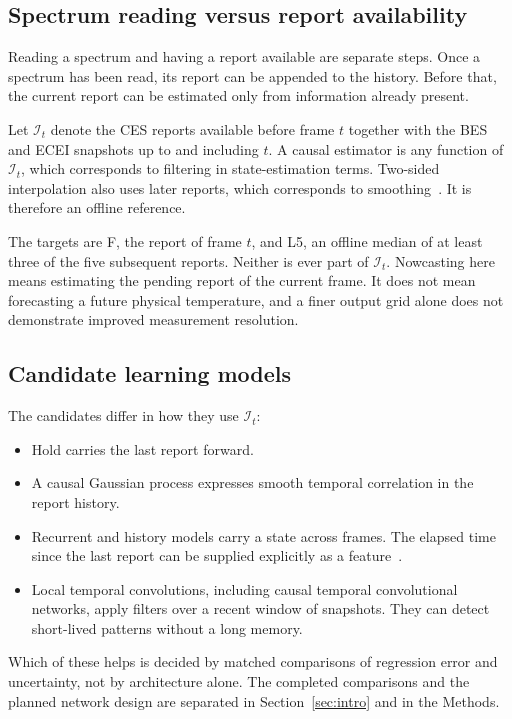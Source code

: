\subsection{Spectrum reading versus report availability}
Reading a spectrum and having a report available are separate steps. Once a spectrum has been read, its report can be appended to the history. Before that, the current report can be estimated only from information already present.

Let $\mathcal{I}_t$ denote the CES reports available before frame $t$ together with the BES and ECEI snapshots up to and including $t$. A causal estimator is any function of $\mathcal{I}_t$, which corresponds to filtering in state-estimation terms. Two-sided interpolation also uses later reports, which corresponds to smoothing~\citep{Shukla2020SurveyPrinciples,VanMulders2025ModelBased}. It is therefore an offline reference.

The targets are F, the report of frame $t$, and L5, an offline median of at least three of the five subsequent reports. Neither is ever part of $\mathcal{I}_t$. Nowcasting here means estimating the pending report of the current frame. It does not mean forecasting a future physical temperature, and a finer output grid alone does not demonstrate improved measurement resolution.

\subsection{Candidate learning models}
The candidates differ in how they use $\mathcal{I}_t$:
\begin{itemize}\setlength{\itemsep}{1pt}
\item Hold carries the last report forward.
\item A causal Gaussian process expresses smooth temporal correlation in the report history.
\item Recurrent and history models carry a state across frames. The elapsed time since the last report can be supplied explicitly as a feature~\citep{Che2018RecurrentNeural}.
\item Local temporal convolutions, including causal temporal convolutional networks, apply filters over a recent window of snapshots. They can detect short-lived patterns without a long memory.
\end{itemize}
Which of these helps is decided by matched comparisons of regression error and uncertainty, not by architecture alone. The completed comparisons and the planned network design are separated in Section~\ref{sec:intro} and in the Methods.
